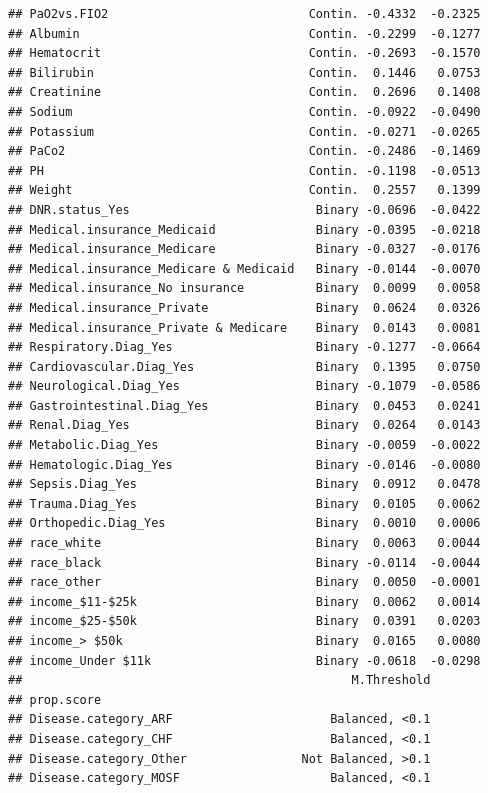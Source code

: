 \documentclass[
]{book}
\begin{document}
\begin{verbatim}
## PaO2vs.FIO2                            Contin. -0.4332  -0.2325
## Albumin                                Contin. -0.2299  -0.1277
## Hematocrit                             Contin. -0.2693  -0.1570
## Bilirubin                              Contin.  0.1446   0.0753
## Creatinine                             Contin.  0.2696   0.1408
## Sodium                                 Contin. -0.0922  -0.0490
## Potassium                              Contin. -0.0271  -0.0265
## PaCo2                                  Contin. -0.2486  -0.1469
## PH                                     Contin. -0.1198  -0.0513
## Weight                                 Contin.  0.2557   0.1399
## DNR.status_Yes                          Binary -0.0696  -0.0422
## Medical.insurance_Medicaid              Binary -0.0395  -0.0218
## Medical.insurance_Medicare              Binary -0.0327  -0.0176
## Medical.insurance_Medicare & Medicaid   Binary -0.0144  -0.0070
## Medical.insurance_No insurance          Binary  0.0099   0.0058
## Medical.insurance_Private               Binary  0.0624   0.0326
## Medical.insurance_Private & Medicare    Binary  0.0143   0.0081
## Respiratory.Diag_Yes                    Binary -0.1277  -0.0664
## Cardiovascular.Diag_Yes                 Binary  0.1395   0.0750
## Neurological.Diag_Yes                   Binary -0.1079  -0.0586
## Gastrointestinal.Diag_Yes               Binary  0.0453   0.0241
## Renal.Diag_Yes                          Binary  0.0264   0.0143
## Metabolic.Diag_Yes                      Binary -0.0059  -0.0022
## Hematologic.Diag_Yes                    Binary -0.0146  -0.0080
## Sepsis.Diag_Yes                         Binary  0.0912   0.0478
## Trauma.Diag_Yes                         Binary  0.0105   0.0062
## Orthopedic.Diag_Yes                     Binary  0.0010   0.0006
## race_white                              Binary  0.0063   0.0044
## race_black                              Binary -0.0114  -0.0044
## race_other                              Binary  0.0050  -0.0001
## income_$11-$25k                         Binary  0.0062   0.0014
## income_$25-$50k                         Binary  0.0391   0.0203
## income_> $50k                           Binary  0.0165   0.0080
## income_Under $11k                       Binary -0.0618  -0.0298
##                                              M.Threshold
## prop.score                                              
## Disease.category_ARF                      Balanced, <0.1
## Disease.category_CHF                      Balanced, <0.1
## Disease.category_Other                Not Balanced, >0.1
## Disease.category_MOSF                     Balanced, <0.1

\end{verbatim}
\end{document}
